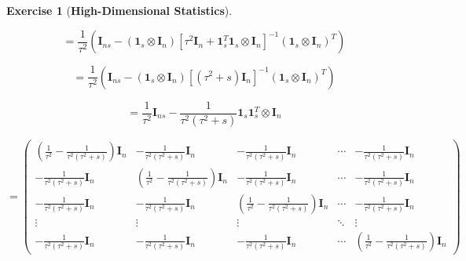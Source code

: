 \documentclass{article}
\theoremstyle{definition}
\newtheorem{exercise}{Exercise}
\theoremstyle{definition}
\theoremstyle{definition}
\theoremstyle{definition}
\begin{document}
\begin{exercise}[\textbf{High-Dimensional Statistics}]
\begin{enumerate}[(a)]
\[
= \frac{1}{\tau^2} \left( \boldsymbol{I}_{ns} - \left(\boldsymbol{1}_s \otimes \boldsymbol{I}_n\right) \left[ \tau^2 \boldsymbol{I}_n + \boldsymbol{1}_s^T\boldsymbol{1}_s \otimes \boldsymbol{I}_n \right]^{-1}\left(\boldsymbol{1}_s \otimes \boldsymbol{I}_n\right)^T \right)
\]

\[
= \frac{1}{\tau^2} \left( \boldsymbol{I}_{ns} - \left(\boldsymbol{1}_s \otimes \boldsymbol{I}_n\right) \left[ (\tau^2 + s)  \boldsymbol{I}_n \right]^{-1}\left(\boldsymbol{1}_s \otimes \boldsymbol{I}_n\right)^T \right)
\]

\[
= \frac{1}{\tau^2} \boldsymbol{I}_{ns} - \frac{1}{\tau^2(\tau^2 + s)} \boldsymbol{1}_s \boldsymbol{1}_s^T\otimes \boldsymbol{I}_n 
\]

\[
=  \begin{pmatrix}
\left( \frac{1}{\tau^2} - \frac{1}{\tau^2(\tau^2 + s)} \right) \boldsymbol{I}_n & - \frac{1}{\tau^2(\tau^2 +s)} \boldsymbol{I}_n & - \frac{1}{\tau^2(\tau^2 +s)} \boldsymbol{I}_n & \cdots & - \frac{1}{\tau^2(\tau^2 +s)} \boldsymbol{I}_n \\
- \frac{1}{\tau^2(\tau^2 +s)} \boldsymbol{I}_n & \left( \frac{1}{\tau^2} - \frac{1}{\tau^2(\tau^2 + s)} \right) \boldsymbol{I}_n &  - \frac{1}{\tau^2(\tau^2 +s)} \boldsymbol{I}_n & \cdots & - \frac{1}{\tau^2(\tau^2 +s)} \boldsymbol{I}_n \\
- \frac{1}{\tau^2(\tau^2 +s)} \boldsymbol{I}_n &  - \frac{1}{\tau^2(\tau^2 +s)} \boldsymbol{I}_n & \left( \frac{1}{\tau^2} - \frac{1}{\tau^2(\tau^2 + s)} \right) \boldsymbol{I}_n  & \cdots & - \frac{1}{\tau^2(\tau^2 +s)} \boldsymbol{I}_n \\
\vdots & \vdots & \vdots & \ddots & \vdots \\
- \frac{1}{\tau^2(\tau^2 +s)} \boldsymbol{I}_n &  - \frac{1}{\tau^2(\tau^2 +s)} \boldsymbol{I}_n & - \frac{1}{\tau^2(\tau^2 +s)} \boldsymbol{I}_n  & \cdots  & \left( \frac{1}{\tau^2} - \frac{1}{\tau^2(\tau^2 + s)} \right) \boldsymbol{I}_n
\end{pmatrix}
\]


\end{enumerate}
\end{exercise}
\end{document}
